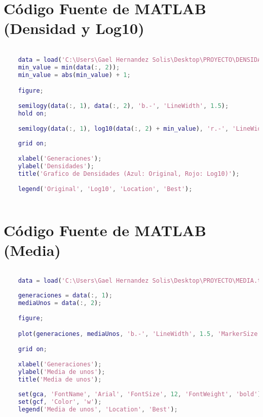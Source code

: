 \documentclass{article}
\begin{document}
	\section{Código Fuente de MATLAB (Densidad y Log10)}
	\begin{lstlisting}[language=Matlab, basicstyle=\tiny, breaklines=true, breakatwhitespace=true]

	data = load('C:\Users\Gael Hernandez Solis\Desktop\PROYECTO\DENSIDAD.txt');
	min_value = min(data(:, 2));
	min_value = abs(min_value) + 1;

	figure;
	
	semilogy(data(:, 1), data(:, 2), 'b.-', 'LineWidth', 1.5); 
	hold on;
	
	semilogy(data(:, 1), log10(data(:, 2) + min_value), 'r.-', 'LineWidth', 1.5); 
	
	grid on;
	
	xlabel('Generaciones');
	ylabel('Densidades');
	title('Grafico de Densidades (Azul: Original, Rojo: Log10)');
	
	legend('Original', 'Log10', 'Location', 'Best');	
		
	\end{lstlisting}
	
	\section{Código Fuente de MATLAB (Media)}
	\begin{lstlisting}[language=Matlab, basicstyle=\tiny, breaklines=true, breakatwhitespace=true]
	
	data = load('C:\Users\Gael Hernandez Solis\Desktop\PROYECTO\MEDIA.txt');
	
	generaciones = data(:, 1);
	mediaUnos = data(:, 2);
	
	figure;

	plot(generaciones, mediaUnos, 'b.-', 'LineWidth', 1.5, 'MarkerSize', 10);
	
	grid on;
	
	xlabel('Generaciones');
	ylabel('Media de unos');
	title('Media de unos');
	
	set(gca, 'FontName', 'Arial', 'FontSize', 12, 'FontWeight', 'bold');
	set(gcf, 'Color', 'w');
	legend('Media de unos', 'Location', 'Best');
		
	\end{lstlisting}
	
\end{document}
